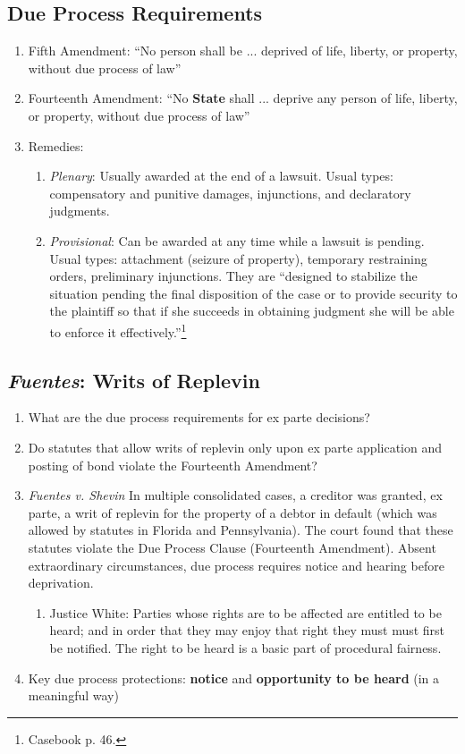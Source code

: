 \subsection{Due Process Requirements}

\begin{enumerate}
    \item Fifth Amendment: ``No person shall be ... deprived of life, liberty, or property, without due process of law''
    \item Fourteenth Amendment: ``No \textbf{State} shall ... deprive any person of life, liberty, or property, without due process of law''
    \item Remedies:
    \begin{enumerate}
        \item \emph{Plenary}: Usually awarded at the end of a lawsuit. Usual types: compensatory and punitive damages, injunctions, and declaratory judgments.
        \item \emph{Provisional}: Can be awarded at any time while a lawsuit is pending. Usual types: attachment (seizure of property), temporary restraining orders, preliminary injunctions. They are ``designed to stabilize the situation pending the final disposition of the case or to provide security to the plaintiff so that if she succeeds in obtaining judgment she will be able to enforce it effectively.''\footnote{Casebook p. 46.}
    \end{enumerate}
\end{enumerate}

\subsection{\emph{Fuentes}: Writs of Replevin}

\begin{enumerate}
    \item What are the due process requirements for ex parte decisions?
    \item Do statutes that allow writs of replevin only upon ex parte application and posting of bond violate the Fourteenth Amendment?
    \item \emph{Fuentes v. Shevin} In multiple consolidated cases, a creditor was granted, ex parte, a writ of replevin for the property of a debtor in default (which was allowed by statutes in Florida and Pennsylvania). The court found that these statutes violate the Due Process Clause (Fourteenth Amendment). Absent extraordinary circumstances, due process requires notice and hearing before deprivation.
    \begin{enumerate}
        \item Justice White: Parties whose rights are to be affected are entitled to be heard; and in order that they may enjoy that right they must must first be notified. The right to be heard is a basic part of procedural fairness.
    \end{enumerate}
    \item Key due process protections: \textbf{notice} and \textbf{opportunity to be heard} (in a meaningful way)
\end{enumerate}

